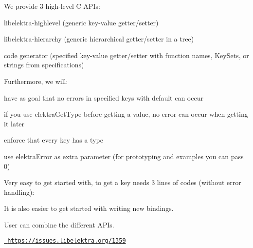 We provide 3 high-\/level C A\+P\+Is\+:


\begin{DoxyEnumerate}
\item libelektra-\/highlevel (generic key-\/value getter/setter)
\item libelektra-\/hierarchy (generic hierarchical getter/setter in a tree)
\item code generator (specified key-\/value getter/setter with function names, Key\+Sets, or strings from specifications)
\end{DoxyEnumerate}

Furthermore, we will\+:


\begin{DoxyItemize}
\item have as goal that no errors in specified keys with default can occur
\item if you use {\ttfamily elektra\+Get\+Type} before getting a value, no error can occur when getting it later
\item enforce that every key has a type
\item use {\ttfamily elektra\+Error} as extra parameter (for prototyping and examples you can pass 0)
\end{DoxyItemize}


\begin{DoxyEnumerate}
\item Very easy to get started with, to get a key needs 3 lines of codes (without error handling)\+:
\end{DoxyEnumerate}


\begin{DoxyCode}{0}
\end{DoxyCode}



\begin{DoxyEnumerate}
\item It is also easier to get started with writing new bindings.
\item User can combine the different A\+P\+Is.
\end{DoxyEnumerate}

\href{https://issues.libelektra.org/1359}{\texttt{ https\+://issues.\+libelektra.\+org/1359}} 